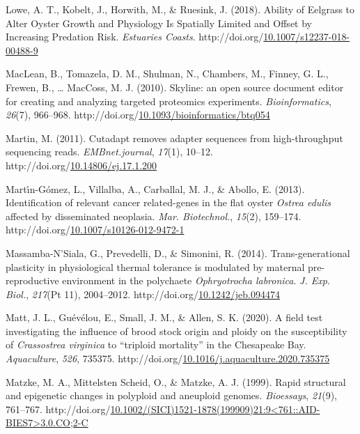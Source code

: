 \documentclass [11pt, proquest] {uwthesis}[2015/03/03]
\newlength{\cslhangindent}
\newenvironment{CSLReferences}%
{\setlength{\parindent}{0pt}%
\everypar{\setlength{\hangindent}{\cslhangindent}}\ignorespaces}%
{\par}
\begin{document}
\begin{CSLReferences}{1}{0}
\leavevmode\hypertarget{ref-Lowe2018}{}%
Lowe, A. T., Kobelt, J., Horwith, M., \& Ruesink, J. (2018). {Ability of Eelgrass to Alter Oyster Growth and Physiology Is Spatially Limited and Offset by Increasing Predation Risk}. \emph{Estuaries Coasts}. http://doi.org/\href{https://doi.org/10.1007/s12237-018-00488-9}{10.1007/s12237-018-00488-9}

\leavevmode\hypertarget{ref-MacLean2010}{}%
MacLean, B., Tomazela, D. M., Shulman, N., Chambers, M., Finney, G. L., Frewen, B., \ldots{} MacCoss, M. J. (2010). {Skyline: an open source document editor for creating and analyzing targeted proteomics experiments}. \emph{Bioinformatics}, \emph{26}(7), 966--968. http://doi.org/\href{https://doi.org/10.1093/bioinformatics/btq054}{10.1093/bioinformatics/btq054}

\leavevmode\hypertarget{ref-Martin2011}{}%
Martin, M. (2011). {Cutadapt removes adapter sequences from high-throughput sequencing reads}. \emph{EMBnet.journal}, \emph{17}(1), 10--12. http://doi.org/\href{https://doi.org/10.14806/ej.17.1.200}{10.14806/ej.17.1.200}

\leavevmode\hypertarget{ref-Martin-Gomez2013}{}%
Martı́n-Gómez, L., Villalba, A., Carballal, M. J., \& Abollo, E. (2013). {Identification of relevant cancer related-genes in the flat oyster \emph{Ostrea edulis} affected by disseminated neoplasia}. \emph{Mar. Biotechnol.}, \emph{15}(2), 159--174. http://doi.org/\href{https://doi.org/10.1007/s10126-012-9472-1}{10.1007/s10126-012-9472-1}

\leavevmode\hypertarget{ref-Massamba-NSiala2014}{}%
Massamba-N'Siala, G., Prevedelli, D., \& Simonini, R. (2014). {Trans-generational plasticity in physiological thermal tolerance is modulated by maternal pre-reproductive environment in the polychaete \emph{Ophryotrocha labronica}}. \emph{J. Exp. Biol.}, \emph{217}(Pt 11), 2004--2012. http://doi.org/\href{https://doi.org/10.1242/jeb.094474}{10.1242/jeb.094474}

\leavevmode\hypertarget{ref-Matt2020}{}%
Matt, J. L., Guévélou, E., Small, J. M., \& Allen, S. K. (2020). {A field test investigating the influence of brood stock origin and ploidy on the susceptibility of \emph{Crassostrea virginica} to {``triploid mortality''} in the Chesapeake Bay}. \emph{Aquaculture}, \emph{526}, 735375. http://doi.org/\href{https://doi.org/10.1016/j.aquaculture.2020.735375}{10.1016/j.aquaculture.2020.735375}

\leavevmode\hypertarget{ref-Matzke1999}{}%
Matzke, M. A., Mittelsten Scheid, O., \& Matzke, A. J. (1999). {Rapid structural and epigenetic changes in polyploid and aneuploid genomes}. \emph{Bioessays}, \emph{21}(9), 761--767. http://doi.org/\href{https://doi.org/10.1002/(SICI)1521-1878(199909)21:9\%3C761::AID-BIES7\%3E3.0.CO;2-C}{10.1002/(SICI)1521-1878(199909)21:9\textless761::AID-BIES7\textgreater3.0.CO;2-C}


\end{CSLReferences}
\end{document}
